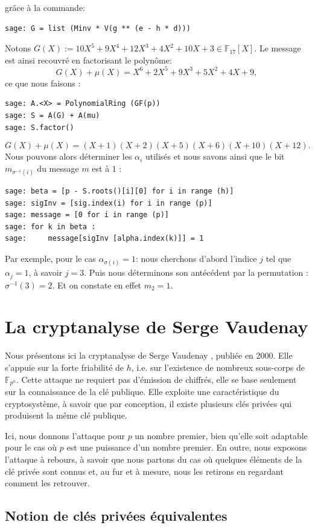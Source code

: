 \documentclass[a4paper, titlepage, 11pt]{article}
\theoremstyle{definition}
\theoremstyle{remark}
\def\gf #1{\mathbb{F}_{#1}}
\begin{document}
grâce à la commande:
\begin{verbatim}
sage: G = list (Minv * V(g ** (e - h * d)))
\end{verbatim}
Notons $G(X) := 10X^5 + 9X^4 + 12X^3 + 4X^2 + 10X + 3 \in \gf{17}[X]$. Le message est ainsi recouvré en factorisant le polynôme:
$$G(X) + \mu(X) = X^6 + 2X^5 + 9X^3 + 5X^2 + 4X + 9,$$
ce que nous faisons :
\begin{verbatim}
sage: A.<X> = PolynomialRing (GF(p))
sage: S = A(G) + A(mu)
sage: S.factor()
\end{verbatim}
$$G(X) + \mu(X) = (X + 1)(X + 2)(X + 5)(X + 6)(X + 10)(X + 12).$$
Nous pouvons alors déterminer les $\alpha_i$ utilisés et nous savons ainsi que le bit $m_{\sigma^{-1}(i)}$ du message $m$ est à $1$ :
\begin{verbatim}
sage: beta = [p - S.roots()[i][0] for i in range (h)]
sage: sigInv = [sig.index(i) for i in range (p)]
sage: message = [0 for i in range (p)]
sage: for k in beta :
sage:     message[sigInv [alpha.index(k)]] = 1
\end{verbatim}
Par exemple, pour le cas $\alpha_{\sigma(i)} = 1$: nous cherchons d'abord l'indice $j$ tel que $\alpha_j = 1$, à savoir $j = 3$. Puis nous déterminons son antécédent par la permutation : $\sigma^{-1}(3) = 2$. Et on constate en effet $m_2 = 1$.

\section{La cryptanalyse de Serge Vaudenay}\label{sec:cryptanalyse}

Nous présentons ici la cryptanalyse de Serge Vaudenay \cite{vaudenay2000}, publiée en 2000. Elle s'appuie sur la forte friabilité de $h$, i.e. sur l'existence de nombreux sous-corps de $\gf{p^h}$. Cette attaque ne requiert pas d'émission de chiffrés, elle se base seulement sur la connaissance de la clé publique. Elle exploite une caractéristique du cryptosystème, à savoir que par conception, il existe plusieurs clés privées qui produisent la même clé publique.

Ici, nous donnons l'attaque pour $p$ un nombre premier, bien qu'elle soit adaptable pour le cas où $p$ est une puissance d'un nombre premier. En outre, nous exposons l'attaque à rebours, à savoir que nous partons du cas où quelques éléments de la clé privée sont connus et, au fur et à mesure, nous les retirons en regardant comment les retrouver.

\subsection{Notion de clés privées équivalentes}
\end{document}
